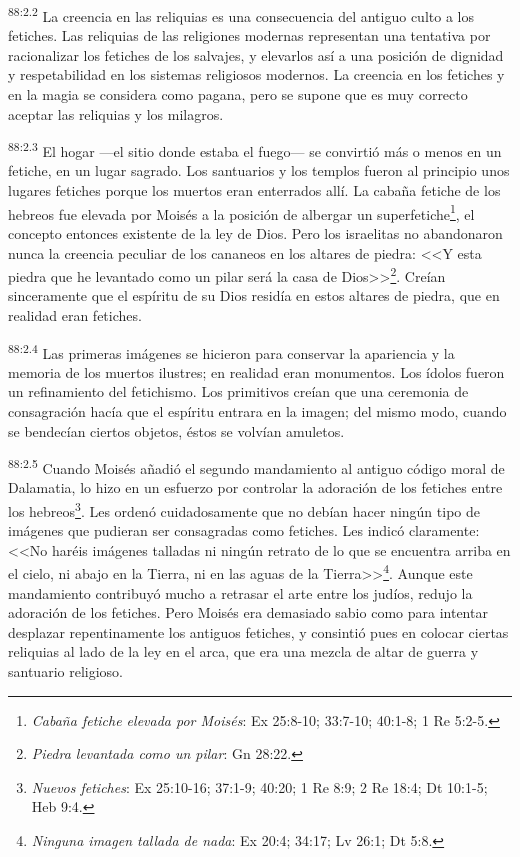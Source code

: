 \documentclass[twoside, 11pt]{book}
\begin{document}
\par
\textsuperscript{88:2.2} La creencia en las reliquias es una consecuencia del antiguo culto a los fetiches. Las reliquias de las religiones modernas representan una tentativa por racionalizar los fetiches de los salvajes, y elevarlos así a una posición de dignidad y respetabilidad en los sistemas religiosos modernos. La creencia en los fetiches y en la magia se considera como pagana, pero se supone que es muy correcto aceptar las reliquias y los milagros.

\par
\textsuperscript{88:2.3} El hogar ---el sitio donde estaba el fuego--- se convirtió más o menos en un fetiche, en un lugar sagrado. Los santuarios y los templos fueron al principio unos lugares fetiches porque los muertos eran enterrados allí. La cabaña fetiche de los hebreos fue elevada por Moisés a la posición de albergar un superfetiche\footnote{\textit{Cabaña fetiche elevada por Moisés}: Ex 25:8-10; 33:7-10; 40:1-8; 1 Re 5:2-5.}, el concepto entonces existente de la ley de Dios. Pero los israelitas no abandonaron nunca la creencia peculiar de los cananeos en los altares de piedra: <<Y esta piedra que he levantado como un pilar será la casa de Dios>>\footnote{\textit{Piedra levantada como un pilar}: Gn 28:22.}. Creían sinceramente que el espíritu de su Dios residía en estos altares de piedra, que en realidad eran fetiches.

\par
\textsuperscript{88:2.4} Las primeras imágenes se hicieron para conservar la apariencia y la memoria de los muertos ilustres; en realidad eran monumentos. Los ídolos fueron un refinamiento del fetichismo. Los primitivos creían que una ceremonia de consagración hacía que el espíritu entrara en la imagen; del mismo modo, cuando se bendecían ciertos objetos, éstos se volvían amuletos.

\par
\textsuperscript{88:2.5} Cuando Moisés añadió el segundo mandamiento al antiguo código moral de Dalamatia, lo hizo en un esfuerzo por controlar la adoración de los fetiches entre los hebreos\footnote{\textit{Nuevos fetiches}: Ex 25:10-16; 37:1-9; 40:20; 1 Re 8:9; 2 Re 18:4; Dt 10:1-5; Heb 9:4.}. Les ordenó cuidadosamente que no debían hacer ningún tipo de imágenes que pudieran ser consagradas como fetiches. Les indicó claramente: <<No haréis imágenes talladas ni ningún retrato de lo que se encuentra arriba en el cielo, ni abajo en la Tierra, ni en las aguas de la Tierra>>\footnote{\textit{Ninguna imagen tallada de nada}: Ex 20:4; 34:17; Lv 26:1; Dt 5:8.}. Aunque este mandamiento contribuyó mucho a retrasar el arte entre los judíos, redujo la adoración de los fetiches. Pero Moisés era demasiado sabio como para intentar desplazar repentinamente los antiguos fetiches, y consintió pues en colocar ciertas reliquias al lado de la ley en el arca, que era una mezcla de altar de guerra y santuario religioso.
\end{document}
